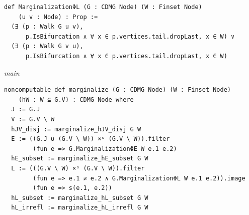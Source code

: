 \begin{verbatim}
def MarginalizationΦL (G : CDMG Node) (W : Finset Node)
    (u v : Node) : Prop :=
  (∃ (p : Walk G u v),
      p.IsBifurcation ∧ ∀ x ∈ p.vertices.tail.dropLast, x ∈ W) ∨
  (∃ (p : Walk G v u),
      p.IsBifurcation ∧ ∀ x ∈ p.vertices.tail.dropLast, x ∈ W)
\end{verbatim}
{\small\textit{main}}
\begin{verbatim}
noncomputable def marginalize (G : CDMG Node) (W : Finset Node)
    (hW : W ⊆ G.V) : CDMG Node where
  J := G.J
  V := G.V \ W
  hJV_disj := marginalize_hJV_disj G W
  E := ((G.J ∪ (G.V \ W)) ×ˢ (G.V \ W)).filter
        (fun e => G.MarginalizationΦE W e.1 e.2)
  hE_subset := marginalize_hE_subset G W
  L := (((G.V \ W) ×ˢ (G.V \ W)).filter
        (fun e => e.1 ≠ e.2 ∧ G.MarginalizationΦL W e.1 e.2)).image
        (fun e => s(e.1, e.2))
  hL_subset := marginalize_hL_subset G W
  hL_irrefl := marginalize_hL_irrefl G W
\end{verbatim}
~%

\vspace{\appendixNotesGap}

